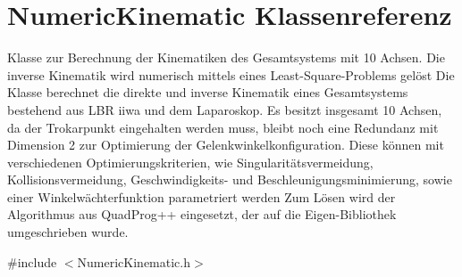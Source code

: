 \hypertarget{classNumericKinematic}{\section{Numeric\-Kinematic Klassenreferenz}
\label{classNumericKinematic}
}


Klasse zur Berechnung der Kinematiken des Gesamtsystems mit 10 Achsen. Die inverse Kinematik wird numerisch mittels eines Least-\/\-Square-\/\-Problems gelöst Die Klasse berechnet die direkte und inverse Kinematik eines Gesamtsystems bestehend aus L\-B\-R iiwa und dem Laparoskop. Es besitzt insgesamt 10 Achsen, da der Trokarpunkt eingehalten werden muss, bleibt noch eine Redundanz mit Dimension 2 zur Optimierung der Gelenkwinkelkonfiguration. Diese können mit verschiedenen Optimierungskriterien, wie Singularitätsvermeidung, Kollisionsvermeidung, Geschwindigkeits-\/ und Beschleunigungsminimierung, sowie einer Winkelwächterfunktion parametriert werden Zum Lösen wird der Algorithmus aus Quad\-Prog++ eingesetzt, der auf die Eigen-\/\-Bibliothek umgeschrieben wurde.  




{\ttfamily \#include $<$Numeric\-Kinematic.\-h$>$}



